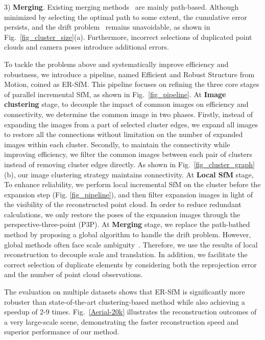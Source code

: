 \documentclass[runningheads]{llncs}
\begin{document}
3) \textbf{Merging}. Existing merging methods~\cite{gsfm,Divide_conquer,AdaSfM,merge,TC-SfM} are mainly path-based. Although minimized by selecting the optimal path to some extent, the cumulative error persists, and the drift problem~\cite{Drift} remains unavoidable, as shown in Fig.~\ref{fig_cluster_size}(a). Furthermore, incorrect selections of duplicated point clouds and camera poses introduce additional errors.

To tackle the problems above and systematically improve efficiency and robustness, we introduce a pipeline, named Efficient and Robust Structure from Motion, coined as ER-SfM. This pipeline focuses on refining the three core stages of parallel incremental SfM, as shown in Fig.~\ref{fig_pipeline}. At \textbf{Image clustering} stage, to decouple the impact of common images on efficiency and connectivity, we determine the common image in two phases. Firstly, instead of expanding the images from a part of selected cluster edges, we expand all images to restore all the connections without limitation on the number of expanded images within each cluster. Secondly, to maintain the connectivity while improving efficiency, we filter the common images between each pair of clusters instead of removing cluster edges directly. As shown in Fig.~\ref{fig_cluster_graph}(b), our image clustering strategy maintains connectivity. At \textbf{Local SfM} stage, To enhance reliability, we perform local incremental SfM on the cluster before the expansion step (Fig. \ref{fig_pipeline}), and then filter expansion images in light of the visibility of the reconstructed point cloud. In order to reduce redundant calculations, we only restore the poses of the expansion images through the perspective-three-point (P3P)\cite{P3P}. At \textbf{Merging} stage, we replace the path-bathed method by proposing a global algorithm to handle the drift problem. However, global methods often face scale ambiguity~\cite{mvg}. Therefore, we use the results of local reconstruction to decouple scale and translation. In addition, we facilitate the correct selection of duplicate elements by considering both the reprojection error and the number of point cloud observations.

The evaluation on multiple datasets shows that ER-SfM is significantly more robuster than state-of-the-art clustering-based method while also achieving a speedup of 2-9 times. Fig.~\ref{Aerial-20k} illustrates the reconstruction outcomes of a very large-scale scene, demonstrating the faster reconstruction speed and superior performance of our method.
\end{document}
